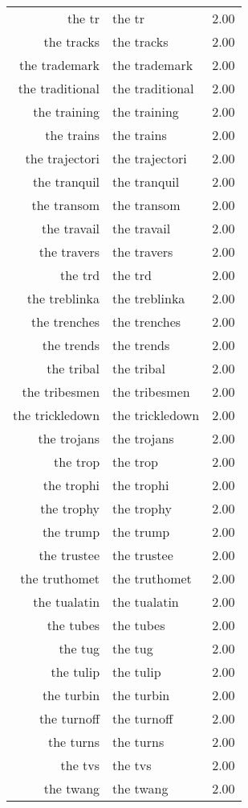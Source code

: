 \begin{table}[ht]
\begin{tabular}{rlr}
  the tr & the tr & 2.00 \\ 
  the tracks & the tracks & 2.00 \\ 
  the trademark & the trademark & 2.00 \\ 
  the traditional & the traditional & 2.00 \\ 
  the training & the training & 2.00 \\ 
  the trains & the trains & 2.00 \\ 
  the trajectori & the trajectori & 2.00 \\ 
  the tranquil & the tranquil & 2.00 \\ 
  the transom & the transom & 2.00 \\ 
  the travail & the travail & 2.00 \\ 
  the travers & the travers & 2.00 \\ 
  the trd & the trd & 2.00 \\ 
  the treblinka & the treblinka & 2.00 \\ 
  the trenches & the trenches & 2.00 \\ 
  the trends & the trends & 2.00 \\ 
  the tribal & the tribal & 2.00 \\ 
  the tribesmen & the tribesmen & 2.00 \\ 
  the trickledown & the trickledown & 2.00 \\ 
  the trojans & the trojans & 2.00 \\ 
  the trop & the trop & 2.00 \\ 
  the trophi & the trophi & 2.00 \\ 
  the trophy & the trophy & 2.00 \\ 
  the trump & the trump & 2.00 \\ 
  the trustee & the trustee & 2.00 \\ 
  the truthomet & the truthomet & 2.00 \\ 
  the tualatin & the tualatin & 2.00 \\ 
  the tubes & the tubes & 2.00 \\ 
  the tug & the tug & 2.00 \\ 
  the tulip & the tulip & 2.00 \\ 
  the turbin & the turbin & 2.00 \\ 
  the turnoff & the turnoff & 2.00 \\ 
  the turns & the turns & 2.00 \\ 
  the tvs & the tvs & 2.00 \\ 
  the twang & the twang & 2.00 \\ 

\end{tabular}
\end{table}
